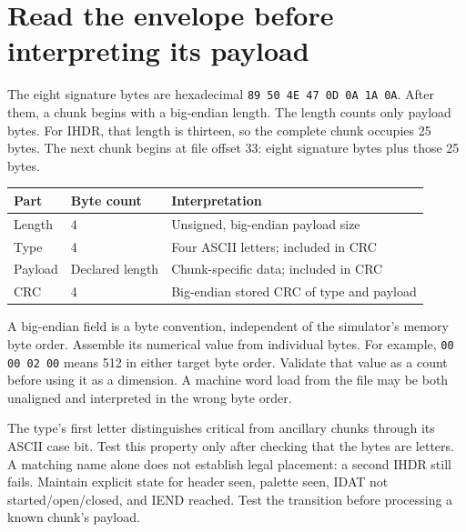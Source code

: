 \section{Read the envelope before interpreting its payload}
The eight signature bytes are hexadecimal \texttt{89 50 4E 47 0D 0A 1A 0A}. After them,
a chunk begins with a big-endian length. The length counts only payload bytes. For
IHDR, that length is thirteen, so the complete chunk occupies 25 bytes. The next
chunk begins at file offset 33: eight signature bytes plus those 25 bytes.

\begin{longtable}{p{24mm}p{35mm}p{91mm}}
  \toprule Part & Byte count      & Interpretation                            \\\midrule
  Length        & 4               & Unsigned, big-endian payload size         \\
  Type          & 4               & Four ASCII letters; included in CRC       \\
  Payload       & Declared length & Chunk-specific data; included in CRC      \\
  CRC           & 4               & Big-endian stored CRC of type and payload \\\bottomrule
\end{longtable}
A big-endian field is a byte convention, independent of the simulator's memory byte
order. Assemble its numerical value from individual bytes. For example,
\texttt{00 00 02 00} means 512 in either target byte order. Validate that value as a
count before using it as a dimension. A machine word load from the file may be both
unaligned and interpreted in the wrong byte order.

The type's first letter distinguishes critical from ancillary chunks through its
ASCII case bit. Test this property only after checking that the bytes are letters.
A matching name alone does not establish legal placement: a second IHDR still fails.
Maintain explicit state for header seen, palette seen, IDAT not started/open/closed,
and IEND reached. Test the transition before processing a known chunk's payload.
